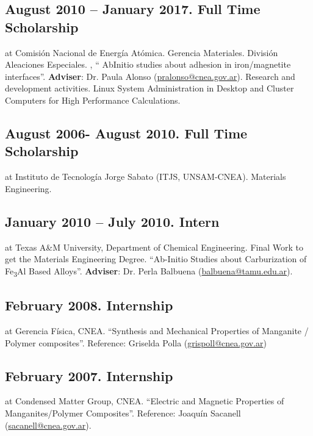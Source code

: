 \subsection{August 2010 – January 2017. Full Time Scholarship} at Comisión
Nacional de Energía Atómica. Gerencia Materiales. División Aleaciones
Especiales. , “ Ab\-Initio studies about adhesion in iron/magnetite interfaces”.
\textbf{Adviser}: Dr. Paula Alonso (\href{mailto:pralonso@cnea.gov.ar}{pralonso@cnea.gov.ar}).
Research and development activities.
Linux System Administration in Desktop and Cluster
Computers for High Performance Calculations.

\subsection{August 2006- August 2010. Full Time Scholarship } at Instituto de
Tecnología Jorge Sabato (ITJS, UNSAM-CNEA). Materials Engineering. 

\subsection{January 2010 – July 2010. Intern } at Texas A\&M University,
Department of Chemical Engineering. Final Work to get the Materials Engineering
Degree. “Ab-Initio Studies about Carburization of Fe\textsubscript{3}Al Based Alloys”.
\textbf{Adviser}: Dr. Perla Balbuena (\href{mailto:balbuena@tamu.edu}{balbuena@tamu.edu.ar}). 

\subsection{February 2008. Internship }at Gerencia Física, CNEA. “Synthesis and
Mechanical Properties of Manganite / Polymer composites”. Reference: Griselda
Polla (\href{mailto:grispoll@cnea.gov.ar}{grispoll@cnea.gov.ar})

\subsection{February 2007. Internship} at Condensed Matter Group, CNEA.
“Electric and Magnetic Properties of Manganites/Polymer Composites”. Reference:
Joaquín Sacanell (\href{sacanell@cnea.gov.ar}{sacanell@cnea.gov.ar}). 

